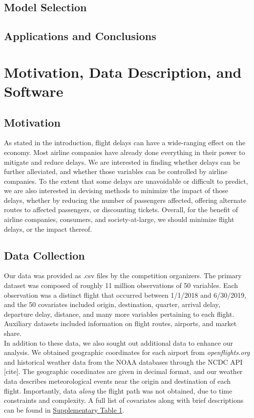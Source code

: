 \documentclass[12pt, a4paper]{book}
\newcommand\tab[1][1cm]{\hspace*{#1}}
\begin{document}
	\section{Model Selection}
	\section{Applications and Conclusions}
	
\chapter{Motivation, Data Description, and Software}
	\section{Motivation}
	\tab As stated in the introduction, flight delays can have a wide-ranging effect on the economy. Most airline companies have already done everything in their power to mitigate and reduce delays. We are interested in finding whether delays can be further alleviated, and whether those variables can be controlled by airline companies. To the extent that some delays are unavoidable or difficult to predict, we are also interested in devising methods to minimize the impact of those delays, whether by reducing the number of passengers affected, offering alternate routes to affected passengers, or discounting tickets. Overall, for the benefit of airline companies, consumers, and society-at-large, we should minimize flight delays, or the impact thereof. 
	\section{Data Collection}
	\tab Our data was provided as .csv files by the competition organizers. The primary dataset was composed of roughly 11 million observations of 50 variables. Each observation was a distinct flight that occurred between 1/1/2018 and 6/30/2019, and the 50 covariates included origin, destination, quarter, arrival delay, departure delay, distance, and many more variables pertaining to each flight. Auxiliary datasets included information on flight routes, airports, and market share. \\
	\tab In addition to these data, we also sought out additional data to enhance our analysis. We obtained geographic coordinates for each airport from \textit{openflights.org} and historical weather data from the NOAA databases through the NCDC API [cite]. The geographic coordinates are given in decimal format, and our weather data describes meteorological events near the origin and destination of each flight. Importantly, data \textit{along} the flight path was not obtained, due to time constraints and complexity. A full list of covariates along with brief descriptions can be found in \underline{Supplementary Table 1}. 
\end{document}
